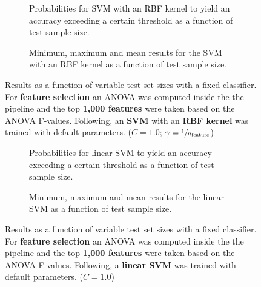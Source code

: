 \begin{figure}
    \captionsetup[subfigure]{justification=justified,singlelinecheck=false}
    \begin{subfigure}[t]{0.61\textwidth}
        
        \caption{Probabilities for SVM with an RBF kernel to yield an accuracy exceeding a certain threshold as a function of test sample size.}
    \end{subfigure}
    \hspace{3.0mm}
    \begin{subfigure}[t]{0.34\textwidth}
        
        \caption{Minimum, maximum and mean results for the SVM with an RBF kernel as a function of test sample size.}
    \end{subfigure}
    \caption[Effects of varying test sample size. SVM (kernel = RBF); Preprocessing: ANOVA feature selection ($k_\text{best} = \num{1000}$)]{Results as a function of variable test set sizes with a fixed classifier. For \textbf{feature selection} an ANOVA was computed inside the the pipeline and the top \textbf{1,000 features} were taken based on the ANOVA F-values. Following, an \textbf{{SVM}} with an \textbf{{RBF kernel}} was trained with default parameters. ($C=\num{1.0}$; $\gamma=\sfrac{1}{n_\text{feature}}$)}
    \label{fig:no_PCA_1000_best_selected_SVC}
\end{figure}

\begin{figure}
    \captionsetup[subfigure]{justification=justified,singlelinecheck=false}
    \begin{subfigure}[t]{0.61\textwidth}
        
        \caption{Probabilities for linear SVM to yield an accuracy exceeding a certain threshold as a function of test sample size.}
    \end{subfigure}
    \hspace{3.0mm}
    \begin{subfigure}[t]{0.34\textwidth}
        
        \caption{Minimum, maximum and mean results for the linear SVM as a function of test sample size.}
    \end{subfigure}
    \caption[Effects of varying test sample size. Linear SVM; Preprocessing: ANOVA feature selection ($k_\text{best} = \num{1000}$)]{Results as a function of variable test set sizes with a fixed classifier. For \textbf{feature selection} an ANOVA was computed inside the the pipeline and the top \textbf{1,000 features} were taken based on the ANOVA F-values. Following, a \textbf{{linear SVM}} was trained with default parameters. ($C=\num{1.0}$)}
    \label{fig:no_PCA_1000_best_selected_LinearSVC}
\end{figure}


